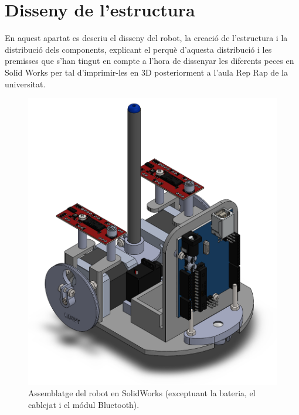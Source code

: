 \setlength\topmargin{8mm}
\onehalfspacing
\chapter{Disseny de l'estructura} %

\label{Chapter4} %


En aquest apartat es descriu el disseny del robot, la creació de l’estructura i la distribució dels components, explicant el perquè d’aquesta distribució i les premisses que s’han tingut en compte a l'hora de dissenyar les diferents peces en Solid Works per tal d'imprimir-les en 3D posteriorment a l'aula Rep Rap de la universitat.   

\begin{figure}[H]
	\centering
	\includegraphics[scale=0.6]{RobotSW.png}
	\caption{Assemblatge del robot en SolidWorks (exceptuant la bateria, el cablejat i el módul Bluetooth).}
	\label{fig:RobotSW}
\end{figure}

